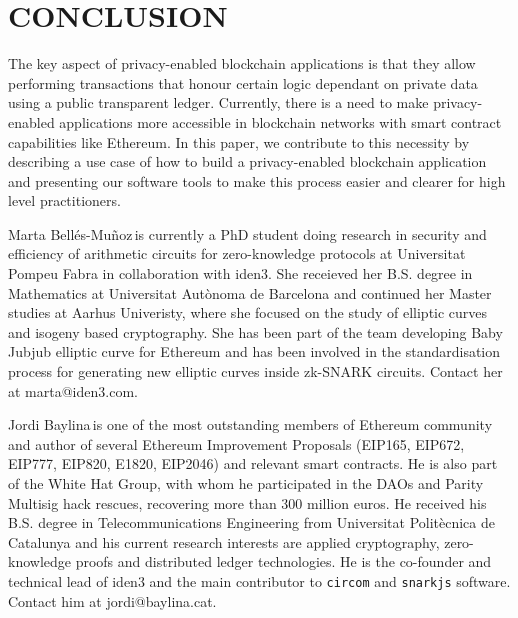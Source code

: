 \documentclass{IEEEcsmag}
\begin{document}
\section{CONCLUSION}

The key aspect of privacy-enabled blockchain applications is that they 
allow performing transactions that honour certain logic dependant on 
private data using a public transparent ledger.
Currently, there is a need to make privacy-enabled applications
more accessible in blockchain networks with smart contract capabilities like Ethereum. 
In this paper, we contribute to this necessity by describing a use case of how to build a privacy-enabled blockchain application and presenting our software tools to
make this process easier and clearer for high level practitioners.




\begin{IEEEbiography}{Marta Bell\'es-Mu\~noz}{\,}is currently a PhD student doing research  
in security and efficiency of arithmetic circuits for zero-knowledge 
protocols at Universitat Pompeu Fabra in collaboration with iden3. 
She receieved her B.S. degree in Mathematics at Universitat Autònoma de Barcelona 
and continued her Master studies at Aarhus Univeristy, where she focused on the 
study of elliptic curves and isogeny based cryptography. 
She has been part of the team developing Baby Jubjub elliptic curve for Ethereum and 
has been involved in the standardisation process for generating new elliptic curves 
inside zk-SNARK circuits. Contact her at marta@iden3.com.
\end{IEEEbiography}

\begin{IEEEbiography}{Jordi Baylina}{\,}is one of the most 
outstanding members of Ethereum community and author of several 
Ethereum Improvement Proposals 
(EIP165, EIP672, EIP777, EIP820, E1820, EIP2046)  
and relevant smart contracts. 
He is also part of the White Hat Group, with whom he participated in the DAOs and 
Parity Multisig hack rescues, recovering more than 300 million euros. 
He received his B.S. degree in Telecommunications Engineering from Universitat
Politècnica de Catalunya and his current research interests are applied
cryptography, zero-knowledge proofs and distributed ledger technologies. 
He is the co-founder and technical lead of iden3 and the main contributor to  
\texttt{circom} and \texttt{snarkjs} software. Contact him at jordi@baylina.cat.	
\end{IEEEbiography}
\end{document}

